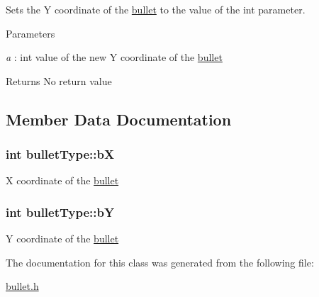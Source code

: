 Sets the Y coordinate of the \hyperlink{classbullet}{bullet} to the value of the int parameter. 
\begin{DoxyParams}{Parameters}
\item[{\em a}]: int value of the new Y coordinate of the \hyperlink{classbullet}{bullet} \end{DoxyParams}
\begin{DoxyReturn}{Returns}
No return value 
\end{DoxyReturn}


\subsection{Member Data Documentation}
\hypertarget{classbulletType_a0078ec4eb7df2062788ae69200a73bf3}{
\subsubsection[{bX}]{\setlength{\rightskip}{0pt plus 5cm}int {\bf bulletType::bX}}}
\label{classbulletType_a0078ec4eb7df2062788ae69200a73bf3}
X coordinate of the \hyperlink{classbullet}{bullet} \hypertarget{classbulletType_a7083d68e84fe928b1e46575fda710d5d}{
\subsubsection[{bY}]{\setlength{\rightskip}{0pt plus 5cm}int {\bf bulletType::bY}}}
\label{classbulletType_a7083d68e84fe928b1e46575fda710d5d}
Y coordinate of the \hyperlink{classbullet}{bullet} 

The documentation for this class was generated from the following file:\begin{DoxyCompactItemize}
\item 
\hyperlink{bullet_8h}{bullet.h}\end{DoxyCompactItemize}
